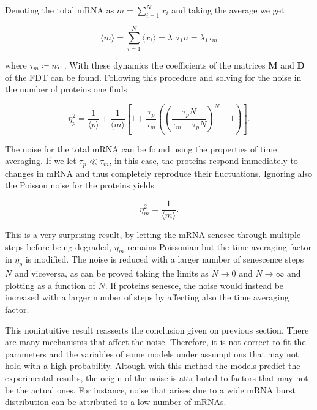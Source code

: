 Denoting the total mRNA as $m=\sum_{i=1}^Nx_i$ and taking the average we get

\begin{equation*}
  \langle m\rangle = \sum_{i=1}^N\langle x_i\rangle = \lambda_1\tau_1n = \lambda_1\tau_m
\end{equation*}

where $\tau_m\coloneqq n\tau_1$. With these dynamics the coefficients of the matrices $\mathbf{M}$ and $\mathbf{D}$ of the FDT can be found. Following this procedure and solving for the noise in the number of proteins one finds

\begin{equation}
  \eta_p^2= \frac{1}{\langle p\rangle}+\frac{1}{\langle m\rangle} \left[1+\frac{\tau_p}{\tau_m}\left(\left(\frac{\tau_pN}{\tau_m+\tau_pN}\right)^N-1\right)\right].
\end{equation}

The noise for the total mRNA can be found using the properties of time averaging. If we let $\tau_p\ll\tau_m$, in this case, the proteins respond immediately to changes in mRNA and thus completely reproduce their fluctuations. Ignoring also the Poisson noise for the proteins yields

\begin{equation}
  \eta_m^2 = \frac{1}{\langle m\rangle}.
\end{equation}

This is a very surprising result, by letting the mRNA senesce through multiple steps before being degraded, $\eta_m$ remains Poissonian but the time averaging factor in $\eta_p$ is modified. The noise is reduced with a larger number of senescence steps $N$ and viceversa, as can be proved taking the limits as $N\to 0$ and $N\to \infty$ and plotting as a function of $N$. If proteins senesce, the noise would instead be increased with a larger number of steps by affecting also the time averaging factor.

This nonintuitive result reasserts the conclusion given on previous section. There are many mechanisms that affect the noise. Therefore, it is not correct to fit the parameters and the variables of some models under assumptions that may not hold with a high probability. Altough with this method the models predict the experimental results, the origin of the noise is attributed to factors that may not be the actual ones. For instance, noise that arises due to a wide mRNA burst distribution can be attributed to a low number of mRNAs.

